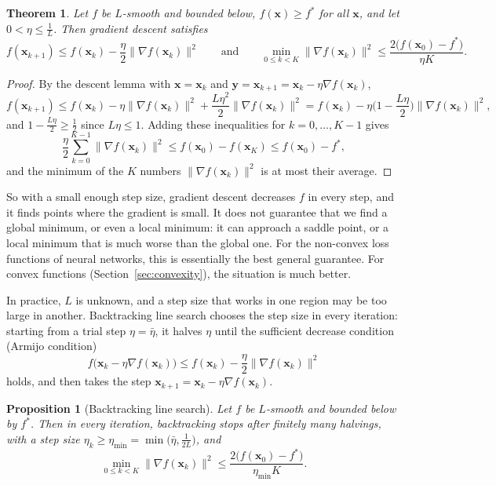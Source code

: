 \documentclass[11pt]{article}
\newcommand{\norm}[1]{\lVert #1 \rVert}
\theoremstyle{definition}
\theoremstyle{plain}
\newtheorem{theorem}[definition]{Theorem}
\newtheorem{proposition}[definition]{Proposition}
\theoremstyle{remark}
\begin{document}
\begin{theorem}\label{thm:gd-smooth}
    Let $f$ be $L$-smooth and bounded below, $f(\mathbf{x}) \geq f^*$ for all $\mathbf{x}$, and let $0 < \eta \leq \frac{1}{L}$. Then gradient descent satisfies
    \[f(\mathbf{x}_{k+1}) \leq f(\mathbf{x}_k) - \frac{\eta}{2}\norm{\nabla f(\mathbf{x}_k)}^2 \qquad \text{and} \qquad \min_{0 \leq k < K} \norm{\nabla f(\mathbf{x}_k)}^2 \leq \frac{2\big(f(\mathbf{x}_0) - f^*\big)}{\eta K}.\]
\end{theorem}

\begin{proof}
    By the descent lemma with $\mathbf{x} = \mathbf{x}_k$ and $\mathbf{y} = \mathbf{x}_{k+1} = \mathbf{x}_k - \eta\nabla f(\mathbf{x}_k)$,
    \[f(\mathbf{x}_{k+1}) \leq f(\mathbf{x}_k) - \eta\norm{\nabla f(\mathbf{x}_k)}^2 + \frac{L\eta^2}{2}\norm{\nabla f(\mathbf{x}_k)}^2 = f(\mathbf{x}_k) - \eta\Big(1 - \frac{L\eta}{2}\Big)\norm{\nabla f(\mathbf{x}_k)}^2,\]
    and $1 - \frac{L\eta}{2} \geq \frac{1}{2}$ since $L\eta \leq 1$. Adding these inequalities for $k = 0, \ldots, K - 1$ gives
    \[\frac{\eta}{2}\sum_{k=0}^{K-1} \norm{\nabla f(\mathbf{x}_k)}^2 \leq f(\mathbf{x}_0) - f(\mathbf{x}_K) \leq f(\mathbf{x}_0) - f^*,\]
    and the minimum of the $K$ numbers $\norm{\nabla f(\mathbf{x}_k)}^2$ is at most their average.
\end{proof}

So with a small enough step size, gradient descent decreases $f$ in every step, and it finds points where the gradient is small. It does not guarantee that we find a global minimum, or even a local minimum: it can approach a saddle point, or a local minimum that is much worse than the global one. For the non-convex loss functions of neural networks, this is essentially the best general guarantee. For convex functions (Section~\ref{sec:convexity}), the situation is much better.

In practice, $L$ is unknown, and a step size that works in one region may be too large in another. Backtracking line search chooses the step size in every iteration: starting from a trial step $\eta = \bar\eta$, it halves $\eta$ until the sufficient decrease condition (Armijo condition)
\[f\big(\mathbf{x}_k - \eta\nabla f(\mathbf{x}_k)\big) \leq f(\mathbf{x}_k) - \frac{\eta}{2}\norm{\nabla f(\mathbf{x}_k)}^2\]
holds, and then takes the step $\mathbf{x}_{k+1} = \mathbf{x}_k - \eta\nabla f(\mathbf{x}_k)$.

\begin{proposition}[Backtracking line search]\label{prop:backtracking}
    Let $f$ be $L$-smooth and bounded below by $f^*$. Then in every iteration, backtracking stops after finitely many halvings, with a step size $\eta_k \geq \eta_{\min} = \min\big(\bar\eta, \frac{1}{2L}\big)$, and
    \[\min_{0 \leq k < K} \norm{\nabla f(\mathbf{x}_k)}^2 \leq \frac{2\big(f(\mathbf{x}_0) - f^*\big)}{\eta_{\min}K}.\]
\end{proposition}
\end{document}
